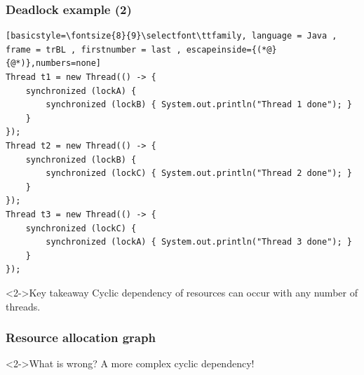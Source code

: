 \documentclass[xcolor={dvipsnames,svgnames},aspectratio=169]{beamer}
\begin{document}
\begin{frame}[fragile]
  \frametitle{\faSkull \quad Deadlock example (2)}

\begin{lstlisting}[basicstyle=\fontsize{8}{9}\selectfont\ttfamily, language = Java ,
frame = trBL , firstnumber = last , escapeinside={(*@}{@*)},numbers=none]
Thread t1 = new Thread(() -> {
    synchronized (lockA) {
        synchronized (lockB) { System.out.println("Thread 1 done"); }
    }
});
Thread t2 = new Thread(() -> {
    synchronized (lockB) {
        synchronized (lockC) { System.out.println("Thread 2 done"); }
    }
});
Thread t3 = new Thread(() -> {
    synchronized (lockC) {
        synchronized (lockA) { System.out.println("Thread 3 done"); }
    }
});
\end{lstlisting}

  \begin{block}<2->{\faLightbulb \quad Key takeaway}
    Cyclic dependency of resources can occur with any number of threads.
  \end{block}
\end{frame}

\begin{frame}[fragile]
  \frametitle{Resource allocation graph}

  \begin{center}
  \end{center}

  \begin{block}<2->{\faPuzzlePiece \quad What is wrong?}
    A more complex cyclic dependency!
  \end{block}

\end{frame}
\end{document}
